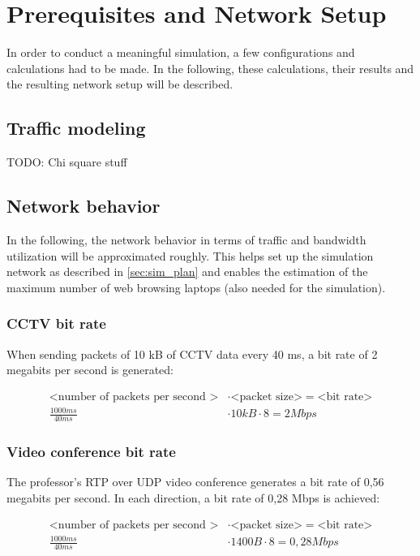 \documentclass[
10pt, %
a4paper, %
oneside, %
headinclude,footinclude, %
BCOR5mm, %
]{scrartcl}
\begin{document}
\section{Prerequisites and Network Setup}

In order to conduct a meaningful simulation, a few configurations and calculations had to be made. In the following, these calculations, their results and the resulting network setup will be described.

\subsection{Traffic modeling}
TODO: Chi square stuff

\subsection{Network behavior}
In the following, the network behavior in terms of traffic and bandwidth utilization will be approximated roughly.
This helps set up the simulation network as described in \ref{sec:sim_plan} and enables the estimation of the maximum number of web browsing laptops (also needed for the simulation).

\subsubsection{CCTV bit rate}
When sending packets of 10 kB of CCTV data every 40 ms, a bit rate of 2 megabits per second is generated:

\begin{align*}
\text{<number of packets per second >} &\cdot \text{<packet size>} = \text{<bit rate>}\\
\frac{1000ms}{40ms} &\cdot 10kB \cdot 8 = 2Mbps
\end{align*}

\subsubsection{Video conference bit rate}
The professor's RTP over UDP video conference generates a bit rate of 0,56 megabits per second. In each direction, a bit rate of 0,28 Mbps is achieved:

\begin{align*}
\text{<number of packets per second >} &\cdot \text{<packet size>} = \text{<bit rate>}\\
\frac{1000ms}{40ms} &\cdot 1400B \cdot 8 = 0,28 Mbps
\end{align*}
\end{document}
